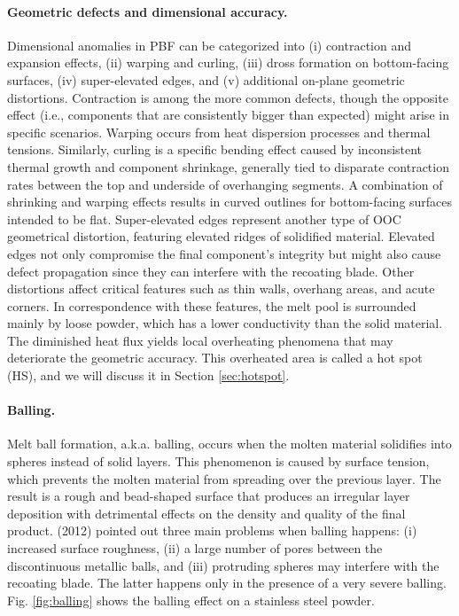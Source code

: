 \paragraph{Geometric defects and dimensional accuracy.} Dimensional anomalies in PBF can be categorized into (i) contraction and expansion effects, (ii) warping and curling, (iii) dross formation on bottom-facing surfaces, (iv) super-elevated edges, and (v) additional on-plane geometric distortions. Contraction is among the more common defects, though the opposite effect (i.e., components that are consistently bigger than expected) might arise in specific scenarios. Warping occurs from heat dispersion processes and thermal tensions. Similarly, curling is a specific bending effect caused by inconsistent thermal growth and component shrinkage, generally tied to disparate contraction rates between the top and underside of overhanging segments. A combination of shrinking and warping effects results in curved outlines for bottom-facing surfaces intended to be flat. Super-elevated edges represent another type of OOC geometrical distortion, featuring elevated ridges of solidified material. Elevated edges not only compromise the final component's integrity but might also cause defect propagation since they can interfere with the recoating blade. Other distortions affect critical features such as thin walls, overhang areas, and acute corners. In correspondence with these features, the melt pool is surrounded mainly by loose powder, which has a lower conductivity than the solid material. The diminished heat flux yields local overheating phenomena that may deteriorate the geometric accuracy. This overheated area is called a hot spot (HS), and we will discuss it in Section \ref{sec:hotspot}.
\paragraph{Balling.} Melt ball formation, a.k.a. balling, occurs when the molten material solidifies into spheres instead of solid layers. This phenomenon is caused by surface tension, which prevents the molten material from spreading over the previous layer. The result is a rough and bead-shaped surface that produces an irregular layer deposition with detrimental effects on the density and quality of the final product. \citeauthor{li_balling_2012}(2012) pointed out three main problems when balling happens: (i) increased surface roughness, (ii) a large number of pores between the discontinuous metallic balls, and (iii) protruding spheres may interfere with the recoating blade. The latter happens only in the presence of a very severe balling. Fig. \ref{fig:balling} shows the balling effect on a stainless steel powder.
